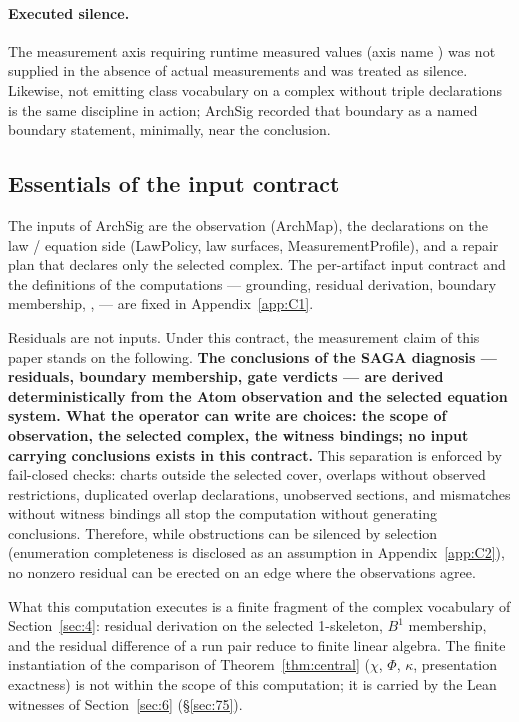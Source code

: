 \paragraph{Executed silence.}
The measurement axis requiring runtime measured values (axis name
) was not supplied in the absence of actual
measurements and was treated as silence. Likewise, not emitting class
vocabulary on a complex without triple declarations is the same
discipline in action; ArchSig recorded that boundary as a named
boundary statement, minimally, near the conclusion.

\subsection{Essentials of the input contract}\label{sec:74}

The inputs of ArchSig are the observation (ArchMap), the declarations
on the law / equation side (LawPolicy, law surfaces,
MeasurementProfile), and a repair plan that declares only the selected
complex. The per-artifact input contract and the definitions of the
computations --- grounding, residual derivation, boundary membership,
,  --- are fixed in Appendix~\ref{app:C1}.

Residuals are not inputs. Under this contract, the measurement claim
of this paper stands on the following. \textbf{The conclusions of the
SAGA diagnosis --- residuals, boundary membership, gate verdicts ---
are derived deterministically from the Atom observation and the
selected equation system. What the operator can write are choices: the
scope of observation, the selected complex, the witness bindings; no
input carrying conclusions exists in this contract.} This separation
is enforced by fail-closed checks: charts outside the selected cover,
overlaps without observed restrictions, duplicated overlap
declarations, unobserved sections, and mismatches without witness
bindings all stop the computation without generating conclusions.
Therefore, while obstructions can be silenced by selection
(enumeration completeness is disclosed as an assumption in
Appendix~\ref{app:C2}), no nonzero residual can be erected on an edge
where the observations agree.

What this computation executes is a finite fragment of the complex
vocabulary of Section~\ref{sec:4}: residual derivation on the selected
1-skeleton, $B^1$ membership, and the residual difference of a run
pair reduce to finite  linear algebra. The finite
instantiation of the comparison of Theorem~\ref{thm:central} ($\chi$,
$\Phi$, $\kappa$, presentation exactness) is not within the scope of
this computation; it is carried by the Lean witnesses of
Section~\ref{sec:6} (\S\ref{sec:75}).

